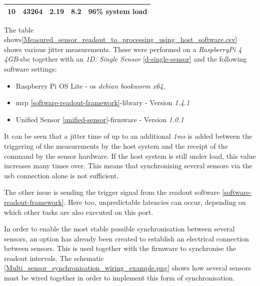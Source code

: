 \begin{longtable}[]{@{}lllll@{}}
\begin{minipage}[t]{0.08\columnwidth}\raggedright
10\strut
\end{minipage} & \begin{minipage}[t]{0.11\columnwidth}\raggedright
43264\strut
\end{minipage} & \begin{minipage}[t]{0.35\columnwidth}\raggedright
2.19\strut
\end{minipage} & \begin{minipage}[t]{0.22\columnwidth}\raggedright
8.2\strut
\end{minipage} & \begin{minipage}[t]{0.10\columnwidth}\raggedright
96\% system load\strut
\end{minipage}\tabularnewline
\bottomrule
\end{longtable}

The table
shows\ref{Measured_sensor_readout_to_processing_using_host_software.csv}
shows various jitter measurements. These were performed on a
\emph{RaspberryPi 4 4GB}-\gls{sbc} together with an \emph{1D: Single
Sensor} \ref{d-single-sensor} and the following software settings:

\begin{itemize}
\tightlist
\item
  Raspberry Pi OS Lite - \gls{os} \emph{debian bookworm x64},
\item
  \gls{mrp} \ref{software-readout-framework}-library - Version
  \emph{1.4.1}
\item
  Unified Sensor \ref{unified-sensor}-firmware - Version \emph{1.0.1}
\end{itemize}

It can be seen that a jitter time of up to an additional \emph{1ms} is
added between the triggering of the measurements by the host system and
the receipt of the command by the sensor hardware. If the host system is
still under load, this value increases many times over. This means that
synchronising several sensors via the \gls{usb} connection alone is not
sufficient.

The other issue is sending the trigger signal from the readout software
\ref{software-readout-framework}. Here too, unpredictable latencies can
occur, depending on which other tasks are also executed on this port.

In order to enable the most stable possible synchronisation between
several sensors, an option has already been created to establish an
electrical connection between sensors. This is used together with the
firmware to synchronise the readout intervals. The schematic
\ref{Multi_sensor_synchronisation_wiring_example.png} shows how several
sensors must be wired together in order to implement this form of
synchronisation.

